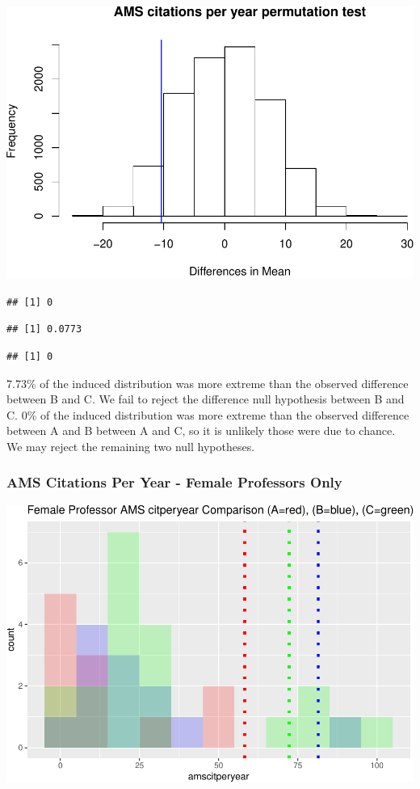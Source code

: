\documentclass[]{article}
\begin{document}
\includegraphics{final_files/figure-latex/unnamed-chunk-39-1.pdf}

\begin{verbatim}
## [1] 0
\end{verbatim}

\begin{verbatim}
## [1] 0.0773
\end{verbatim}

\begin{verbatim}
## [1] 0
\end{verbatim}

7.73\% of the induced distribution was more extreme than the observed
difference between B and C. We fail to reject the difference null
hypothesis between B and C. 0\% of the induced distribution was more
extreme than the observed difference between A and B between A and C, so
it is unlikely those were due to chance. We may reject the remaining two
null hypotheses.

\hypertarget{ams-citations-per-year---female-professors-only}{%
\subsubsection{AMS Citations Per Year - Female Professors
Only}\label{ams-citations-per-year---female-professors-only}}

\includegraphics{final_files/figure-latex/unnamed-chunk-41-1.pdf}
\end{document}
